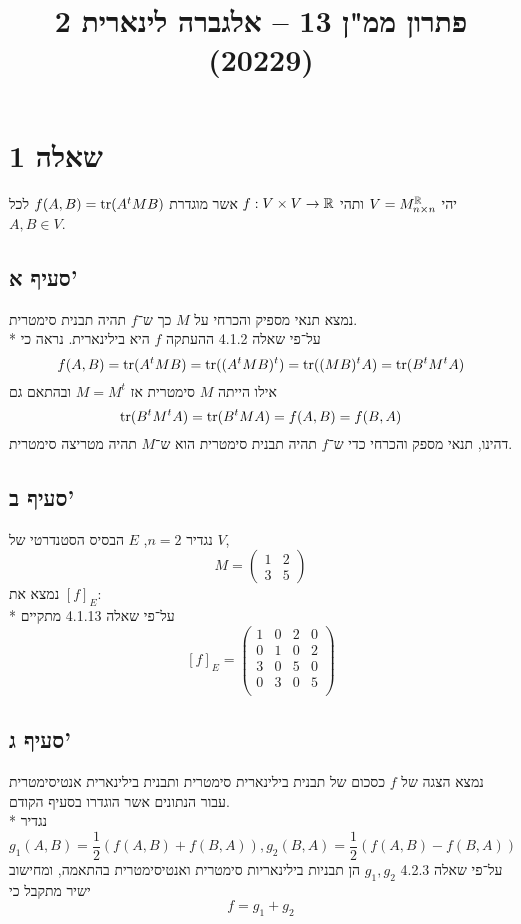 
\title{פתרון ממ"ן 13 – אלגברה לינארית 2 (20229)}


\maketitle

\section{שאלה 1}
יהי $V = M_{n \times n}^{\mathbb{R}}$ ותהי $f: V \times V \to \mathbb{R}$ אשר מוגדרת $f(A, B) = \operatorname{tr}(A^t M B)$ לכל $A, B \in V$.

\subsection{סעיף א'}
נמצא תנאי מספיק והכרחי על $M$ כך ש־$f$ תהיה תבנית סימטרית. \\*
על־פי שאלה 4.1.2 ההעתקה $f$ היא בילינארית. נראה כי
\[
	f(A, B) = \operatorname{tr}(A^t M B) = \operatorname{tr}( (A^t M B)^t ) = \operatorname{tr}( (M B)^t A) = \operatorname{tr}( B^t M^t A)
\]
אילו הייתה $M$ סימטרית אז $M = M^t$ ובהתאם גם
\[
	\operatorname{tr}(B^t M^t A) = \operatorname{tr}( B^t M A) = f(A, B) = f(B, A)
\]
דהינו, תנאי מספק והכרחי כדי ש־$f$ תהיה תבנית סימטרית הוא ש־$M$ תהיה מטריצה סימטרית.

\subsection{סעיף ב'}
נגדיר $n = 2$, $E$ הבסיס הסטנדרטי של $V$,
\[
	M = \begin{pmatrix}
		1 & 2 \\
		3 & 5
	\end{pmatrix}
\]
נמצא את $[f]_E$: \\*
על־פי שאלה 4.1.13 מתקיים
\[
	[f]_E = \begin{pmatrix}
		1 & 0 & 2 & 0 \\
		0 & 1 & 0 & 2 \\
		3 & 0 & 5 & 0 \\
		0 & 3 & 0 & 5 \\
	\end{pmatrix}
\]

\subsection{סעיף ג'}
נמצא הצגה של $f$ כסכום של תבנית בילינארית סימטרית ותבנית בילינארית אנטיסימטרית עבור הנתונים אשר הוגדרו בסעיף הקודם. \\*
נגדיר
\[
	g_1(A, B) = \frac{1}{2} (f(A, B) + f(B, A)), g_2(B, A) = \frac{1}{2}(f(A, B) - f(B, A))
\]
על־פי שאלה 4.2.3 $g_1, g_2$ הן תבניות בילינאריות סימטרית ואנטיסימטרית בהתאמה, ומחישוב ישיר מתקבל כי
\[
	f = g_1 + g_2
\]

